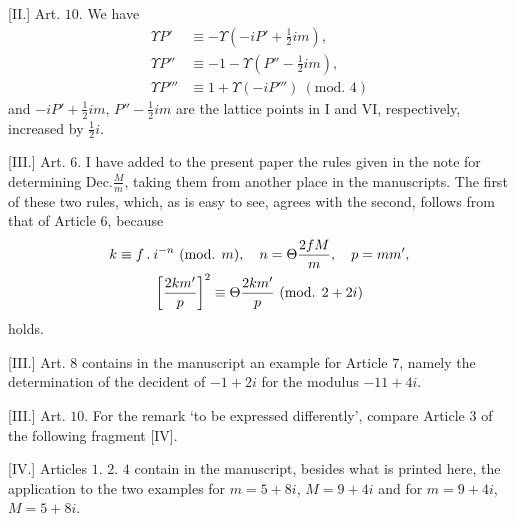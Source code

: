 [II.] Art. $10$. We have
\[
\begin{aligned}
\Upsilon P'&\equiv-\Upsilon(-iP'+\tfrac12im),\\
\Upsilon P''&\equiv-1-\Upsilon(P''-\tfrac12im),\\
\Upsilon P'''&\equiv1+\Upsilon(-iP''')\ (\text{mod. }4)
\end{aligned}
\]
and $-iP'+\tfrac12im$, $P''-\tfrac12im$ are the lattice points in I and VI, respectively, increased by $\tfrac12i$.

[III.] Art. $6$. I have added to the present paper the rules given in the note for determining $\mathrm{Dec.}\frac Mm$, taking them from another place in the manuscripts. The first of these two rules, which, as is easy to see, agrees with the second, follows from that of Article $6$, because
\[
\begin{gathered}
k\equiv f\mathbin{.} i^{-n}\ (\text{mod. }m),\quad n=\Theta\frac{2fM}{m},\quad p=mm',\\
\left[\frac{2km'}p\right]^2\equiv\Theta\frac{2km'}p\ (\text{mod. }2+2i)
\end{gathered}
\]
holds.

[III.] Art. $8$ contains in the manuscript an example for Article $7$, namely the determination of the decident of $-1+2i$ for the modulus $-11+4i$.

[III.] Art. $10$. For the remark ‘to be expressed differently’, compare Article $3$ of the following fragment [IV].

[IV.] Articles $1$. $2$. $4$ contain in the manuscript, besides what is printed here, the application to the two examples for $m=5+8i$, $M=9+4i$ and for $m=9+4i$, $M=5+8i$.
